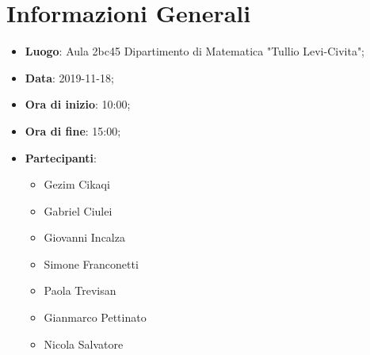 \section{Informazioni Generali}
	\begin{itemize}
		\item \textbf {Luogo}: Aula 2bc45 Dipartimento di Matematica "Tullio Levi-Civita";
		\item \textbf {Data}: 2019-11-18;
		\item \textbf {Ora di inizio}: 10:00;
		\item \textbf {Ora di fine}: 15:00;
		\item \textbf {Partecipanti}: 
			\begin{itemize}
				\item Gezim Cikaqi
				\item Gabriel Ciulei
				\item Giovanni Incalza
				\item Simone Franconetti
				\item Paola Trevisan
				\item Gianmarco Pettinato
				\item Nicola Salvatore
			\end{itemize}
	\end{itemize}